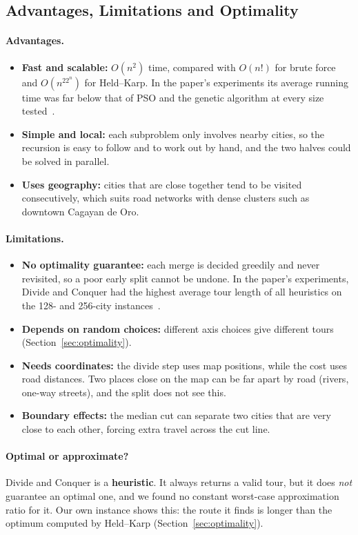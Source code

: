 \subsection{Advantages, Limitations and Optimality}

\paragraph{Advantages.}
\begin{itemize}
  \item \textbf{Fast and scalable:} $O(n^2)$ time, compared with $O(n!)$ for brute force and $O(n^22^n)$ for
        Held--Karp. In the paper's experiments its average running time was far below that of PSO and the
        genetic algorithm at every size tested~\cite{lunagarcia2024performance}.
  \item \textbf{Simple and local:} each subproblem only involves nearby cities, so the recursion is easy
        to follow and to work out by hand, and the two halves could be solved in parallel.
  \item \textbf{Uses geography:} cities that are close together tend to be visited consecutively,
        which suits road networks with dense clusters such as downtown Cagayan de Oro.
\end{itemize}

\paragraph{Limitations.}
\begin{itemize}
  \item \textbf{No optimality guarantee:} each merge is decided greedily and never revisited, so a poor
        early split cannot be undone. In the paper's experiments, Divide and Conquer had the highest
        average tour length of all heuristics on the 128- and 256-city instances~\cite{lunagarcia2024performance}.
      \item \textbf{Depends on random choices:} different axis choices give different tours (Section~\ref{sec:optimality}).
  \item \textbf{Needs coordinates:} the divide step uses map positions, while the cost uses road
        distances. Two places close on the map can be far apart by road (rivers, one-way streets), and
        the split does not see this.
  \item \textbf{Boundary effects:} the median cut can separate two cities that are very close to each
        other, forcing extra travel across the cut line.
\end{itemize}

\paragraph{Optimal or approximate?} Divide and Conquer is a \textbf{heuristic}. It always returns a valid
tour, but it does \emph{not} guarantee an optimal one, and we found no constant worst-case approximation
ratio for it. Our own instance shows this: the route it finds is longer than the optimum computed
by Held--Karp (Section~\ref{sec:optimality}).
